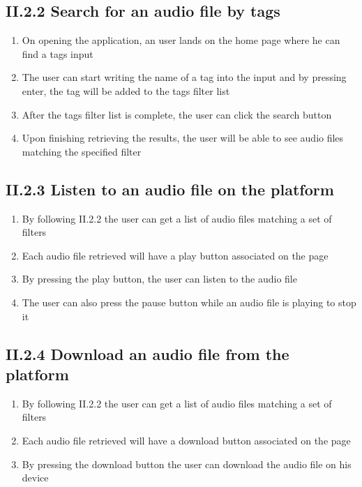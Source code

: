 \documentclass[11pt, a4papper]{report}
\theoremstyle{plain}
\theoremstyle{definition}
\theoremstyle{definition}
\theoremstyle{proposition}
\begin{document}
\subsection*{II.2.2 Search for an audio file by tags}

\begin{enumerate}
	\item{On opening the application, an user lands on the home page where he can find a tags input}
	\item{The user can start writing the name of a tag into the input and by pressing enter, the tag will be added to the tags filter list}
	\item{After the tags filter list is complete, the user can click the search button}
	\item{Upon finishing retrieving the results, the user will be able to see audio files matching the specified filter}
\end{enumerate}

	
\subsection*{II.2.3 Listen to an audio file on the platform}

\begin{enumerate}
	\item{By following II.2.2 the user can get a list of audio files matching a set of filters}
	\item{Each audio file retrieved will have a play button associated on the page}
	\item{By pressing the play button, the user can listen to the audio file}
	\item{The user can also press the pause button while an audio file is playing to stop it}
\end{enumerate}

\subsection*{II.2.4 Download an audio file from the platform}

\begin{enumerate}
	\item{By following II.2.2 the user can get a list of audio files matching a set of filters}
	\item{Each audio file retrieved will have a download button associated on the page}
	\item{By pressing the download button the user can download the audio file on his device}
\end{enumerate}
\end{document}
